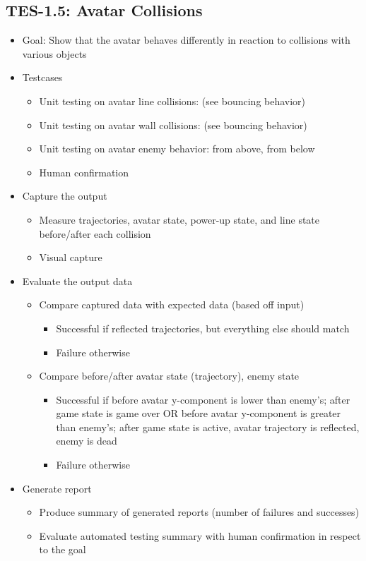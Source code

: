 \subsection{TES-1.5: Avatar Collisions}
\begin{itemize}
\item Goal: Show that the avatar behaves differently in reaction to collisions with various objects

\item Testcases
\begin{itemize}
\item Unit testing on avatar line collisions: (see bouncing behavior)
\item Unit testing on avatar wall collisions: (see bouncing behavior)
\item Unit testing on avatar enemy behavior: from above, from below
\item Human confirmation
\end{itemize}

\item Capture the output
\begin{itemize}
\item Measure trajectories, avatar state, power-up state, and line state before/after each collision
\item Visual capture
\end{itemize}

\item Evaluate the output data
\begin{itemize}
\item Compare captured data with expected data (based off input)
\begin{itemize}
\item Successful if reflected trajectories, but everything else should match
\item Failure otherwise
\end{itemize}
\item Compare before/after avatar state (trajectory), enemy state
\begin{itemize}
\item Successful if before avatar y-component is lower than enemy's; after game state is game over OR before avatar y-component is greater than enemy's; after game state is active, avatar trajectory is reflected, enemy is dead
\item Failure otherwise
\end{itemize}
\end{itemize}

\item Generate report
\begin{itemize}
\item Produce summary of generated reports (number of failures and successes)
\item Evaluate automated testing summary with human confirmation in respect to the goal
\end{itemize}
\end{itemize}



